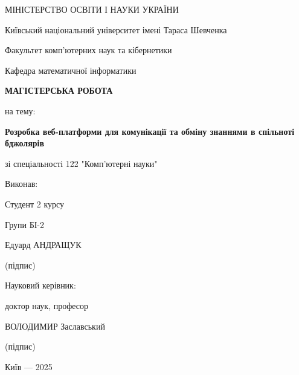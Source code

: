 
\begin{titlepage}
    \centering
    \vspace*{1cm}
    
    {\Large МІНІСТЕРСТВО ОСВІТИ І НАУКИ УКРАЇНИ\par}
    \vspace{0.5cm}
    {\Large Київський національний університет імені Тараса Шевченка\par}
    \vspace{0.5cm}
    {\Large Факультет комп'ютерних наук та кібернетики\par}
    \vspace{0.5cm}
    {\Large Кафедра математичної інформатики\par}
    
    \vfill %
    
    {\bfseries\Large МАГІСТЕРСЬКА РОБОТА\par}
    \vspace{0.5cm}
    {\Large на тему:\par}
    \vspace{1cm}
    {\bfseries\huge Розробка веб-платформи для комунікації та обміну знаннями в спільноті бджолярів\par}
    
    \vspace{2cm}
    
    {\Large зі спеціальності 122 "Комп'ютерні науки"\par}
    
    \vfill
    
    \begin{flushright}
    \vspace{1cm}
    {\Large Виконав:\par}
    {\Large Студент 2 курсу\par}
    {\Large Групи БІ-2\par}
    {\Large Едуард АНДРАЩУК\par}
    \vspace{0.5cm}
    {\Large \underline{\hspace{5cm}} (підпис)\par}
    \vspace{1cm}
    {\Large Науковий керівник:\par}
    {\Large доктор наук, професор\par}
    {\Large ВОЛОДИМИР Заславський\par}
    \vspace{0.5cm}
    {\Large \underline{\hspace{5cm}} (підпис)\par}
    \end{flushright}
    
    \vfill %
    
    {\Large Київ — 2025\par}
    \vspace*{1cm}
    
\end{titlepage} 